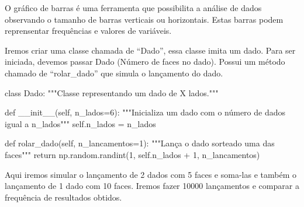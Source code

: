 \documentclass[
  letterpaper,
  DIV=11,
  numbers=noendperiod]{scrreprt}
\newenvironment{Shaded}{\begin{snugshade}}{\end{snugshade}}
\newcommand{\CommentTok}[1]{\textcolor[rgb]{0.37,0.37,0.37}{#1}}
\newcommand{\ControlFlowTok}[1]{\textcolor[rgb]{0.00,0.23,0.31}{#1}}
\newcommand{\DecValTok}[1]{\textcolor[rgb]{0.68,0.00,0.00}{#1}}
\newcommand{\FunctionTok}[1]{\textcolor[rgb]{0.28,0.35,0.67}{#1}}
\newcommand{\KeywordTok}[1]{\textcolor[rgb]{0.00,0.23,0.31}{#1}}
\newcommand{\NormalTok}[1]{\textcolor[rgb]{0.00,0.23,0.31}{#1}}
\newcommand{\OperatorTok}[1]{\textcolor[rgb]{0.37,0.37,0.37}{#1}}
\newcommand{\VariableTok}[1]{\textcolor[rgb]{0.07,0.07,0.07}{#1}}
\begin{document}
O gráfico de barras é uma ferramenta que possibilita a análise de dados
observando o tamanho de barras verticais ou horizontais. Estas barras
podem reprensentar frequências e valores de variáveis.

Iremos criar uma classe chamada de ``Dado'', essa classe imita um dado.
Para ser iniciada, devemos passar Dado (Número de faces no dado). Possui
um método chamado de ``rolar\_dado'' que simula o lançamento do dado.

\begin{Shaded}
\begin{Highlighting}[]
\KeywordTok{class}\NormalTok{ Dado:}
    \CommentTok{"""Classe representando um dado de X lados."""}
    
    \KeywordTok{def} \FunctionTok{\_\_init\_\_}\NormalTok{(}\VariableTok{self}\NormalTok{, n\_lados}\OperatorTok{=}\DecValTok{6}\NormalTok{):}
        \CommentTok{"""Inicializa um dado com o número de dados igual a n\_lados"""}
        \VariableTok{self}\NormalTok{.n\_lados }\OperatorTok{=}\NormalTok{ n\_lados}
        
    \KeywordTok{def}\NormalTok{ rolar\_dado(}\VariableTok{self}\NormalTok{, n\_lancamentos}\OperatorTok{=}\DecValTok{1}\NormalTok{):}
        \CommentTok{"""Lança o dado sorteado uma das faces"""}
        \ControlFlowTok{return}\NormalTok{ np.random.randint(}\DecValTok{1}\NormalTok{, }\VariableTok{self}\NormalTok{.n\_lados }\OperatorTok{+} \DecValTok{1}\NormalTok{, n\_lancamentos)}
\end{Highlighting}
\end{Shaded}

Aqui iremos simular o lançamento de 2 dados com 5 faces e soma-las e
também o lançamento de 1 dado com 10 faces. Iremos fazer 10000
lançamentos e comparar a frequência de resultados obtidos.
\end{document}
